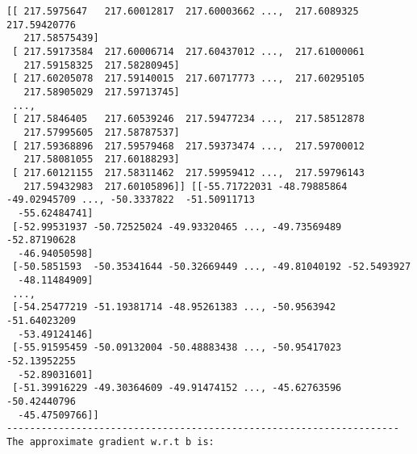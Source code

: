 \documentclass{article}
\begin{document}
\begin{lstlisting}
[[ 217.5975647   217.60012817  217.60003662 ...,  217.6089325   217.59420776
   217.58575439]
 [ 217.59173584  217.60006714  217.60437012 ...,  217.61000061
   217.59158325  217.58280945]
 [ 217.60205078  217.59140015  217.60717773 ...,  217.60295105
   217.58905029  217.59713745]
 ..., 
 [ 217.5846405   217.60539246  217.59477234 ...,  217.58512878
   217.57995605  217.58787537]
 [ 217.59368896  217.59579468  217.59373474 ...,  217.59700012
   217.58081055  217.60188293]
 [ 217.60121155  217.58311462  217.59959412 ...,  217.59796143
   217.59432983  217.60105896]] [[-55.71722031 -48.79885864 -49.02945709 ..., -50.3337822  -51.50911713
  -55.62484741]
 [-52.99531937 -50.72525024 -49.93320465 ..., -49.73569489 -52.87190628
  -46.94050598]
 [-50.5851593  -50.35341644 -50.32669449 ..., -49.81040192 -52.5493927
  -48.11484909]
 ..., 
 [-54.25477219 -51.19381714 -48.95261383 ..., -50.9563942  -51.64023209
  -53.49124146]
 [-55.91595459 -50.09132004 -50.48883438 ..., -50.95417023 -52.13952255
  -52.89031601]
 [-51.39916229 -49.30364609 -49.91474152 ..., -45.62763596 -50.42440796
  -45.47509766]]
--------------------------------------------------------------------
The approximate gradient w.r.t b is:


\end{lstlisting}
\end{document}
